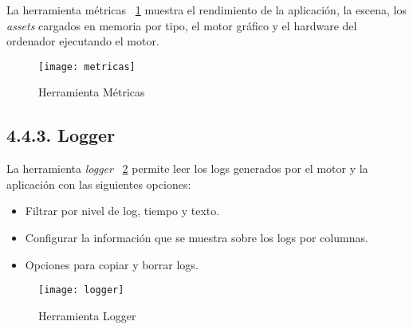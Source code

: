 La herramienta métricas \figurename~\ref{metrics_tool} muestra el rendimiento de la aplicación, 
la escena, los \textit{assets} cargados en memoria por tipo, el motor gráfico y el hardware del ordenador ejecutando el motor.

\begin{figure}[h!]
    \centering
    \texttt{[image: metricas]}
    \caption{Herramienta Métricas}
    \label{metrics_tool}
\end{figure}

\subsection*{4.4.3. Logger}\label{sec:workflow_debugger_logger}

La herramienta \textit{logger} \figurename~\ref{logger_tool} permite leer los logs generados por el motor y la aplicación
con las siguientes opciones:
\begin{itemize}
    \item Filtrar por nivel de log, tiempo y texto.
    \item Configurar la información que se muestra sobre los logs por columnas.
    \item Opciones para copiar y borrar logs.
\end{itemize}

\begin{figure}[h!]
    \centering
    \texttt{[image: logger]}
    \caption{Herramienta Logger}
    \label{logger_tool}
\end{figure}
